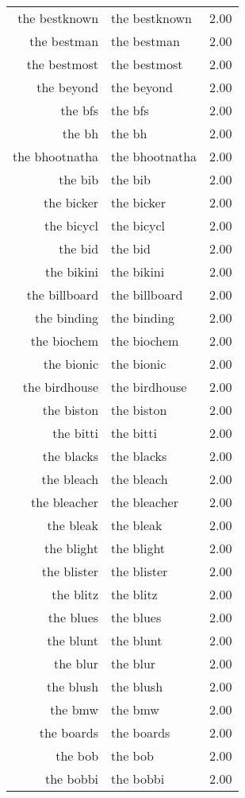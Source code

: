 \begin{table}[ht]
\begin{tabular}{rlr}
  the bestknown & the bestknown & 2.00 \\ 
  the bestman & the bestman & 2.00 \\ 
  the bestmost & the bestmost & 2.00 \\ 
  the beyond & the beyond & 2.00 \\ 
  the bfs & the bfs & 2.00 \\ 
  the bh & the bh & 2.00 \\ 
  the bhootnatha & the bhootnatha & 2.00 \\ 
  the bib & the bib & 2.00 \\ 
  the bicker & the bicker & 2.00 \\ 
  the bicycl & the bicycl & 2.00 \\ 
  the bid & the bid & 2.00 \\ 
  the bikini & the bikini & 2.00 \\ 
  the billboard & the billboard & 2.00 \\ 
  the binding & the binding & 2.00 \\ 
  the biochem & the biochem & 2.00 \\ 
  the bionic & the bionic & 2.00 \\ 
  the birdhouse & the birdhouse & 2.00 \\ 
  the biston & the biston & 2.00 \\ 
  the bitti & the bitti & 2.00 \\ 
  the blacks & the blacks & 2.00 \\ 
  the bleach & the bleach & 2.00 \\ 
  the bleacher & the bleacher & 2.00 \\ 
  the bleak & the bleak & 2.00 \\ 
  the blight & the blight & 2.00 \\ 
  the blister & the blister & 2.00 \\ 
  the blitz & the blitz & 2.00 \\ 
  the blues & the blues & 2.00 \\ 
  the blunt & the blunt & 2.00 \\ 
  the blur & the blur & 2.00 \\ 
  the blush & the blush & 2.00 \\ 
  the bmw & the bmw & 2.00 \\ 
  the boards & the boards & 2.00 \\ 
  the bob & the bob & 2.00 \\ 
  the bobbi & the bobbi & 2.00 \\ 

\end{tabular}
\end{table}
